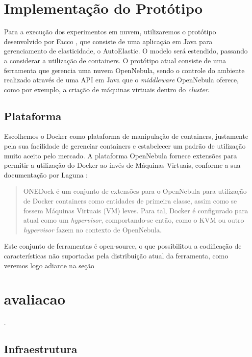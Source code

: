 \documentclass[twoside,english,brazilian]{UNISINOSartigo}
\begin{document}
\section{Implementação do Protótipo}
\label{prototype}

Para a execução dos experimentos em nuvem, utilizaremos o protótipo desenvolvido por Facco , que consiste de uma aplicação em Java para gerenciamento de elasticidade, o AutoElastic. O modelo será estendido, passando a considerar a utilização de containers. O protótipo atual consiste de uma ferramenta que gerencia uma nuvem OpenNebula, sendo o controle do ambiente realizado através de uma API em Java que o \textit{middleware} OpenNebula oferece, como por exemplo, a criação de máquinas virtuais dentro do \textit{cluster}. 

\subsection{Plataforma}
Escolhemos o Docker como plataforma de manipulação de containers, justamente pela sua facilidade de gerenciar containers e estabelecer um padrão de utilização muito aceito pelo mercado. A plataforma OpenNebula fornece extensões para permitir a utilização do Docker ao invés de Máquinas Virtuais, conforme a sua documentação por Laguna :

\begin{quote}
ONEDock é um conjunto de extensões para o OpenNebula para utilização de Docker containers como entidades de primeira classe, assim como se fossem Máquinas Virtuais (VM) leves. Para tal, Docker é configurado para atual como um \textit{hypervisor}, comportando-se então, como o KVM ou outro \textit{hypervisor} fazem no contexto de OpenNebula.
\end{quote} 

Este conjunto de ferramentas é open-source, o que possibilitou a codificação de características não suportadas pela distribuição atual da ferramenta, como veremos logo adiante na seção \section{avaliacao}.

\subsection{Infraestrutura}
\end{document}
